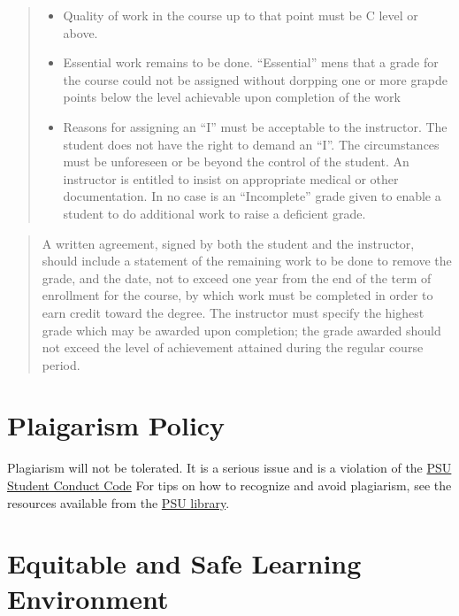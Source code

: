 \documentclass[11pt,]{article}
\providecommand{\tightlist}{%
  \setlength{\itemsep}{0pt}\setlength{\parskip}{0pt}}
\begin{document}
\begin{quote}
\begin{itemize}
\tightlist
\item
  Quality of work in the course up to that point must be C level or
  above.
\item
  Essential work remains to be done. ``Essential'' mens that a grade for
  the course could not be assigned without dorpping one or more grapde
  points below the level achievable upon completion of the work
\item
  Reasons for assigning an ``I'' must be acceptable to the instructor.
  The student does not have the right to demand an ``I''. The
  circumstances must be unforeseen or be beyond the control of the
  student. An instructor is entitled to insist on appropriate medical or
  other documentation. In no case is an ``Incomplete'' grade given to
  enable a student to do additional work to raise a deficient grade.
\end{itemize}
\end{quote}

\begin{quote}
A written agreement, signed by both the student and the instructor,
should include a statement of the remaining work to be done to remove
the grade, and the date, not to exceed one year from the end of the term
of enrollment for the course, by which work must be completed in order
to earn credit toward the degree. The instructor must specify the
highest grade which may be awarded upon completion; the grade awarded
should not exceed the level of achievement attained during the regular
course period.
\end{quote}

\hypertarget{plaigarism-policy}{%
\section{Plaigarism Policy}\label{plaigarism-policy}}

Plagiarism will not be tolerated. It is a serious issue and is a
violation of the
\href{https://www.pdx.edu/dos/psu-student-code-conduct}{PSU Student
Conduct Code} For tips on how to recognize and avoid plagiarism, see the
resources available from the
\href{https://library.pdx.edu/diy/avoid-plagiarism}{PSU library}.

\hypertarget{equitable-and-safe-learning-environment}{%
\section{Equitable and Safe Learning
Environment}\label{equitable-and-safe-learning-environment}}
\end{document}
